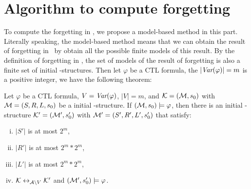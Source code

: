 \documentclass{article}
\begin{document}
\section{Algorithm to compute forgetting}
To compute the forgetting in \CTL, we propose a model-based method in this part.
Literally speaking, the model-based method means that we can obtain the result of forgetting in \CTL\ by obtain all the possible finite models of this result.
By the definition of forgetting in \CTL, the set of models of the result of forgetting is also a finite set of initial \MPK-structures.
%
%
Then let $\varphi$ be a CTL formula, the $|\textit{Var}(\varphi)|=m$ is a positive integer, we have the following theorem:
\begin{theorem}
Let $\varphi$ be a CTL formula, $V=\textit{Var}(\varphi)$, $|V|=m$, and ${\cal K}=({\cal M}, s_0)$ with ${\cal M}=(S, R,L,s_0)$ be a initial \MPK-structure. If $({\cal M}, s_0) \models \varphi$, then there is an initial \MPK-structure ${\cal K}'=({\cal M}', s_0')$ with ${\cal M}'=(S', R',L',s_0')$ that satisfy:
\begin{enumerate}[(i)]
  \item $|S'|$ is at most $2^m$,
  \item $|R'|$ is at most $2^m * 2^m$,
  \item $|L'|$ is at most $2^m * 2^m$,
  \item ${\cal K} \leftrightarrow_{{\cal A} \setminus V} {\cal K}'$ and $({\cal M}', s_0') \models \varphi$.
\end{enumerate}
\end{theorem}
\end{document}
